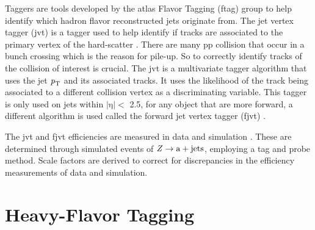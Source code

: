 Taggers are tools developed by the \gls{atlas} Flavor Tagging (\gls{ftag}) group to help identify which hadron flavor reconstructed jets originate from. 
The jet vertex tagger (\gls{jvt}) is a tagger used to help identify if tracks are associated to the primary vertex of the hard-scatter \cite{jvt}. There are many \gls{pp} collision that 
occur in a bunch crossing which is the reason for pile-up. So to correctly identify tracks of the collision of interest is crucial. The \gls{jvt} is a multivariate tagger 
algorithm that uses the jet $\textrm{\textit{p}}_{\textrm{T}}$ and its associated tracks. It uses the likelihood of the track being associated to a different collision vertex 
as a discriminating variable. This tagger is only used on jets within $|\textrm{η}| < $ 2.5, for any object that are more forward, a different algorithm is used called the 
forward jet vertex tagger (\gls{fjvt}) \cite{fjvt}.
\par
The \gls{jvt} and \gls{fjvt} efficiencies are measured in data and simulation \cite{jvt,fjvt}. These are determined through simulated events of $\textrm{\textit{Z}} \rightarrow \textrm{a} + \textrm{jets}$,
employing a tag and probe method. Scale factors are derived to correct for discrepancies in the efficiency measurements of data and simulation. 

\section{Heavy-Flavor Tagging}\label{sec:heavyFlavorTagging}


